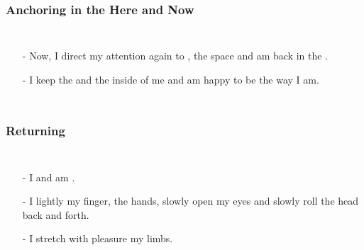 \begin{frame}
\frametitle{Anchoring in the Here and Now}
\begin{columns}[c] %

\begin{itemize}
\item[-] Now, I direct my attention again to , the space and am back in the .
  \item[-] I keep the  and the  inside of me and am happy to be the way I am.
\end{itemize}
\end{columns}
\end{frame}

\begin{frame}
\frametitle{Returning}
\begin{columns}[c] %

\begin{itemize}
\item[-] I  and am .
\item[-] I lightly  my finger, the hands, slowly open my eyes and slowly roll the head back and forth.
  \item[-] I stretch with pleasure my limbs.
  \end{itemize}
\end{columns}
\end{frame}
